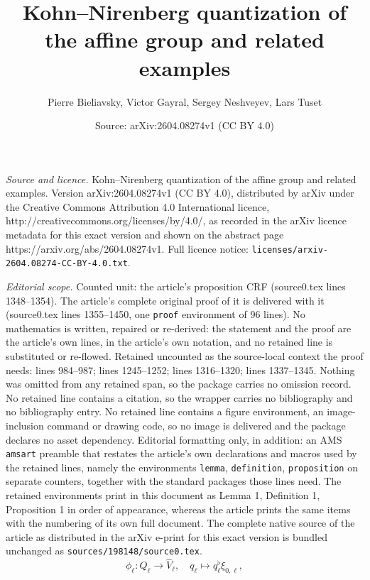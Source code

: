 \documentclass[10pt,a4paper]{amsart}
\title{Kohn--Nirenberg quantization of the affine group and related examples}
\author{Pierre Bieliavsky, Victor Gayral, Sergey Neshveyev, Lars Tuset}
\date{Source: arXiv:2604.08274v1 (CC BY 4.0)}
\begin{document}
\maketitle

\noindent\emph{Source and licence.} Kohn--Nirenberg quantization of the affine group and related examples. Version arXiv:2604.08274v1 (CC BY 4.0), distributed by arXiv under the Creative Commons Attribution 4.0 International licence, http://creativecommons.org/licenses/by/4.0/, as recorded in the arXiv licence metadata for this exact version and shown on the abstract page https://arxiv.org/abs/2604.08274v1. Full licence notice: \texttt{licenses/arxiv-2604.08274-CC-BY-4.0.txt}.\par\smallskip

\noindent\textit{Editorial scope.} Counted unit: the article's proposition CRF (source0.tex lines 1348--1354). The article's complete original proof of it is delivered with it (source0.tex lines 1355--1450, one \texttt{proof} environment of 96 lines). No mathematics is written, repaired or re-derived: the statement and the proof are the article's own lines, in the article's own notation, and no retained line is substituted or re-flowed.  Retained uncounted as the source-local context the proof needs: lines 984--987; lines 1245--1252; lines 1316--1320; lines 1337--1345.  Nothing was omitted from any retained span, so the package carries no omission record.  No retained line contains a citation, so the wrapper carries no bibliography and no bibliography entry.  No retained line contains a figure environment, an image-inclusion command or drawing code, so no image is delivered and the package declares no asset dependency.  Editorial formatting only, in addition: an AMS \texttt{amsart} preamble that restates the article's own declarations and macros used by the retained lines, namely the environments \texttt{lemma}, \texttt{definition}, \texttt{proposition} on separate counters, together with the standard packages those lines need.  The retained environments print in this document as Lemma 1, Definition 1, Proposition 1 in order of appearance, whereas the article prints the same items with the numbering of its own full document.  The complete native source of the article as distributed in the arXiv e-print for this exact version is bundled unchanged as \texttt{sources/198148/source0.tex}.
 \begin{equation}
 \label{phi}
\phi_\ell:Q_\ell\to \hat V_\ell, \quad q_\ell\mapsto q_\ell^\flat\xi_{0,\ell},
\end{equation}
\end{document}
